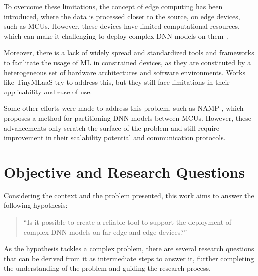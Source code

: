 To overcome these limitations, the concept of edge computing has been
introduced, where the data is processed closer to the source, on edge devices,
such as \acp{MCU}. However, these devices have limited computational
resources, which can make it challenging to deploy complex \ac{DNN} models on
them~\cite{teerapittayannon::ddnn}.

Moreover, there is a lack of widely spread and standardized tools and frameworks 
to facilitate the usage of \ac{ML} in constrained devices, as they are constituted by
a heterogeneous set of hardware architectures and software environments. Works
like \ac{TinyMLaaS} \cite{doyu::tinymlaas} try to address this, but they still face
limitations in their applicability and ease of use.

Some other efforts were made to address this problem, such as NAMP \cite{rego::namp},
which proposes a method for partitioning \ac{DNN} models between \acp{MCU}. 
However, these advancements only scratch the surface of the problem and still 
require improvement in their scalability potential and communication protocols.


\section{Objective and Research Questions} \label{sec:hypothesis}

Considering the context and the problem presented, this work aims to answer the
following hypothesis:

\begin{quote} %
  ``Is it possible to create a reliable tool to support the deployment 
  of complex DNN models on far-edge and edge devices?'' 
\end{quote}


As the hypothesis tackles a complex problem, there are several research
questions that can be derived from it as intermediate steps to answer it,
further completing the understanding of the problem and guiding the
research process.


